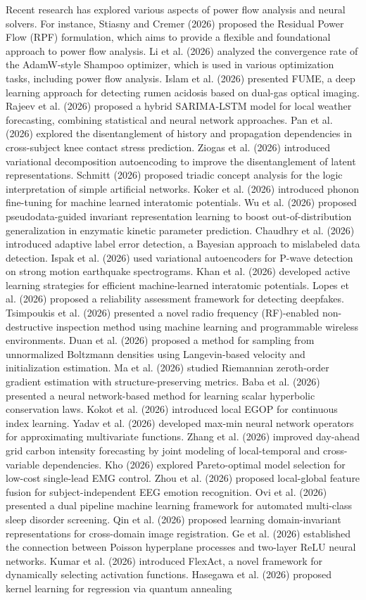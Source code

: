 Recent research has explored various aspects of power flow analysis and neural solvers. For instance, Stiasny and Cremer (2026) proposed the Residual Power Flow (RPF) formulation, which aims to provide a flexible and foundational approach to power flow analysis. Li et al. (2026) analyzed the convergence rate of the AdamW-style Shampoo optimizer, which is used in various optimization tasks, including power flow analysis. Islam et al. (2026) presented FUME, a deep learning approach for detecting rumen acidosis based on dual-gas optical imaging. Rajeev et al. (2026) proposed a hybrid SARIMA-LSTM model for local weather forecasting, combining statistical and neural network approaches. Pan et al. (2026) explored the disentanglement of history and propagation dependencies in cross-subject knee contact stress prediction. Ziogas et al. (2026) introduced variational decomposition autoencoding to improve the disentanglement of latent representations. Schmitt (2026) proposed triadic concept analysis for the logic interpretation of simple artificial networks. Koker et al. (2026) introduced phonon fine-tuning for machine learned interatomic potentials. Wu et al. (2026) proposed pseudodata-guided invariant representation learning to boost out-of-distribution generalization in enzymatic kinetic parameter prediction. Chaudhry et al. (2026) introduced adaptive label error detection, a Bayesian approach to mislabeled data detection. Ispak et al. (2026) used variational autoencoders for P-wave detection on strong motion earthquake spectrograms. Khan et al. (2026) developed active learning strategies for efficient machine-learned interatomic potentials. Lopes et al. (2026) proposed a reliability assessment framework for detecting deepfakes. Tsimpoukis et al. (2026) presented a novel radio frequency (RF)-enabled non-destructive inspection method using machine learning and programmable wireless environments. Duan et al. (2026) proposed a method for sampling from unnormalized Boltzmann densities using Langevin-based velocity and initialization estimation. Ma et al. (2026) studied Riemannian zeroth-order gradient estimation with structure-preserving metrics. Baba et al. (2026) presented a neural network-based method for learning scalar hyperbolic conservation laws. Kokot et al. (2026) introduced local EGOP for continuous index learning. Yadav et al. (2026) developed max-min neural network operators for approximating multivariate functions. Zhang et al. (2026) improved day-ahead grid carbon intensity forecasting by joint modeling of local-temporal and cross-variable dependencies. Kho (2026) explored Pareto-optimal model selection for low-cost single-lead EMG control. Zhou et al. (2026) proposed local-global feature fusion for subject-independent EEG emotion recognition. Ovi et al. (2026) presented a dual pipeline machine learning framework for automated multi-class sleep disorder screening. Qin et al. (2026) proposed learning domain-invariant representations for cross-domain image registration. Ge et al. (2026) established the connection between Poisson hyperplane processes and two-layer ReLU neural networks. Kumar et al. (2026) introduced FlexAct, a novel framework for dynamically selecting activation functions. Hasegawa et al. (2026) proposed kernel learning for regression via quantum annealing 